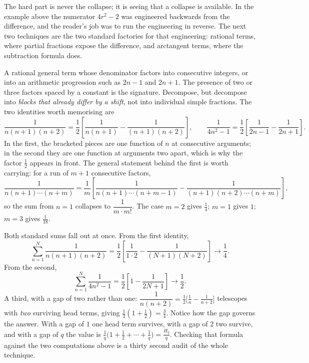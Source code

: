 The hard part is never the collapse; it is seeing that a collapse is available. In the example above the numerator $4r^{2}-2$ was engineered backwards from the difference, and the reader's job was to run the engineering in reverse. The next two techniques are the two standard factories for that engineering: rational terms, where partial fractions expose the difference, and arctangent terms, where the subtraction formula does.

\cue A rational general term whose denominator factors into consecutive integers, or into an arithmetic progression such as $2n-1$ and $2n+1$. The presence of two or three factors spaced by a constant is the signature.
\method Decompose, but decompose into \emph{blocks that already differ by a shift}, not into individual simple fractions. The two identities worth memorising are
\[\frac{1}{n(n+1)(n+2)}=\frac12\left[\frac{1}{n(n+1)}-\frac{1}{(n+1)(n+2)}\right],\qquad \frac{1}{4n^{2}-1}=\frac12\left[\frac{1}{2n-1}-\frac{1}{2n+1}\right].\]
In the first, the bracketed pieces are one function of $n$ at consecutive arguments; in the second they are one function at arguments two apart, which is why the factor $\tfrac12$ appears in front.
The general statement behind the first is worth carrying: for a run of $m+1$ consecutive factors,
\[\frac{1}{n(n+1)\cdots(n+m)}=\frac{1}{m}\left[\frac{1}{n(n+1)\cdots(n+m-1)}-\frac{1}{(n+1)(n+2)\cdots(n+m)}\right],\]
so the sum from $n=1$ collapses to $\dfrac{1}{m\cdot m!}$. The case $m=2$ gives $\tfrac14$; $m=1$ gives $1$; $m=3$ gives $\tfrac1{18}$.

\begin{worked}
Both standard sums fall out at once. From the first identity,
\[\sum_{n=1}^{N}\frac{1}{n(n+1)(n+2)}=\frac12\left[\frac{1}{1\cdot2}-\frac{1}{(N+1)(N+2)}\right]\longrightarrow\frac14.\]
From the second,
\[\sum_{n=1}^{N}\frac{1}{4n^{2}-1}=\frac12\left[1-\frac{1}{2N+1}\right]\longrightarrow\frac12.\]
A third, with a gap of two rather than one: $\dfrac{1}{n(n+2)}=\tfrac12\bigl[\tfrac1n-\tfrac1{n+2}\bigr]$ telescopes with \emph{two} surviving head terms, giving $\tfrac12(1+\tfrac12)=\tfrac34$.
Notice how the gap governs the answer. With a gap of $1$ one head term survives, with a gap of $2$ two survive, and with a gap of $q$ the value is $\tfrac1q\bigl(1+\tfrac12+\cdots+\tfrac1q\bigr)=\tfrac{H_q}{q}$. Checking that formula against the two computations above is a thirty second audit of the whole technique.
\end{worked}

